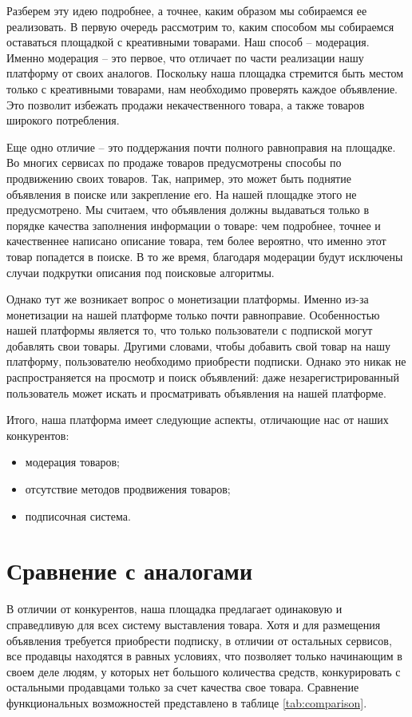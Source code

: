 \documentclass[a4paper,14pt]{extarticle}
\begin{document}
Разберем эту идею подробнее, а точнее, каким образом мы собираемся ее реализовать. В первую очередь рассмотрим то, каким способом мы собираемся оставаться площадкой с креативными товарами. Наш способ -- модерация. Именно модерация -- это первое, что отличает по части реализации нашу платформу от своих аналогов. Поскольку наша площадка стремится быть местом только с креативными товарами, нам необходимо проверять каждое объявление. Это позволит избежать продажи некачественного товара, а также товаров широкого потребления.

Еще одно отличие -- это поддержания почти полного равноправия на площадке. Во многих сервисах по продаже товаров предусмотрены способы по продвижению своих товаров. Так, например, это может быть поднятие объявления в поиске или закрепление его. На нашей площадке этого не предусмотрено. Мы считаем, что объявления должны выдаваться только в порядке качества заполнения информации о товаре: чем подробнее, точнее и качественнее написано описание товара, тем более вероятно, что именно этот товар попадется в поиске. В то же время, благодаря модерации будут исключены случаи подкрутки описания под поисковые алгоритмы.

Однако тут же возникает вопрос о монетизации платформы. Именно из-за монетизации на нашей платформе только почти равноправие. Особенностью нашей платформы является то, что только пользователи с подпиской могут добавлять свои товары. Другими словами, чтобы добавить свой товар на нашу платформу, пользователю необходимо приобрести подписки. Однако это никак не распространяется на просмотр и поиск объявлений: даже незарегистрированный пользователь может искать и просматривать объявления на нашей платформе.

Итого, наша платформа имеет следующие аспекты, отличающие нас от наших конкурентов:
\begin{itemize}
    \item модерация товаров;
    \item отсутствие методов продвижения товаров;
    \item подписочная система.
\end{itemize}

\section{Сравнение с аналогами}

В отличии от конкурентов, наша площадка предлагает одинаковую и справедливую для всех систему выставления товара. Хотя и для размещения объявления требуется приобрести подписку, в отличии от остальных сервисов, все продавцы находятся в равных условиях, что позволяет только начинающим в своем деле людям, у которых нет большого количества средств, конкурировать с остальными продавцами только за счет качества свое товара. Сравнение функциональных возможностей представлено в таблице \ref{tab:comparison}.
\end{document}
